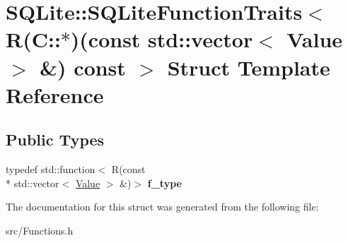 \hypertarget{struct_s_q_lite_1_1_s_q_lite_function_traits_3_01_r_07_c_1_1_5_08_07const_01std_1_1vector_3_01_v08f1300bbf380c5f1a7474d1c599ae8c}{\section{S\-Q\-Lite\-:\-:S\-Q\-Lite\-Function\-Traits$<$ R(C\-:\-:$\ast$)(const std\-:\-:vector$<$ Value $>$ \&) const $>$ Struct Template Reference}
\label{struct_s_q_lite_1_1_s_q_lite_function_traits_3_01_r_07_c_1_1_5_08_07const_01std_1_1vector_3_01_v08f1300bbf380c5f1a7474d1c599ae8c}
}
\subsection*{Public Types}
\begin{DoxyCompactItemize}
\item 
\hypertarget{struct_s_q_lite_1_1_s_q_lite_function_traits_3_01_r_07_c_1_1_5_08_07const_01std_1_1vector_3_01_v08f1300bbf380c5f1a7474d1c599ae8c_a8066b3ac6cc8a95fc2751988f7fb3688}{typedef std\-::function$<$ R(const \\*
std\-::vector$<$ \hyperlink{class_s_q_lite_1_1_value}{Value} $>$ \&)$>$ {\bfseries f\-\_\-type}}\label{struct_s_q_lite_1_1_s_q_lite_function_traits_3_01_r_07_c_1_1_5_08_07const_01std_1_1vector_3_01_v08f1300bbf380c5f1a7474d1c599ae8c_a8066b3ac6cc8a95fc2751988f7fb3688}

\end{DoxyCompactItemize}


The documentation for this struct was generated from the following file\-:\begin{DoxyCompactItemize}
\item 
src/Functions.\-h\end{DoxyCompactItemize}
